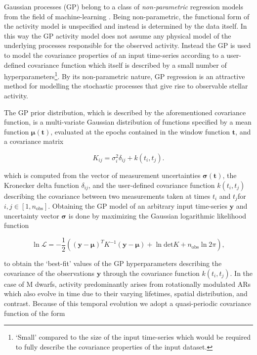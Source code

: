 Gaussian processes (GP) belong to a class of \emph{non-parametric} regression models from the field of machine-learning
\citep{rasmussen05}.
Being non-parametric, the functional form of the activity model is unspecified and instead is determined by the
data itself. In this way the GP activity model does not assume 
any physical model of the underlying processes responsible for the observed activity. Instead the GP is
used to model the covariance properties 
of an input time-series according to a user-defined covariance function which itself is described by a small number
of hyperparameters\footnote{`Small' compared to the size of the input time-series which would be required to fully
  describe the covariance properties of the input dataset.}.
By its non-parametric nature, GP regression is an attractive method for modelling the stochastic processes that give
rise to observable stellar activity.

The GP prior distribution, which is described by the aforementioned covariance function,
is a multi-variate Gaussian distribution of functions specified by a mean function
$\boldsymbol{\mu}(\mathbf{t})$, evaluated at the epochs contained in the window function $\mathbf{t}$,
and a covariance matrix

\begin{equation}
  K_{ij} = \sigma_i^2 \delta_{ij} + k(t_i,t_j). \label{BSeq:K}
\end{equation}

\noindent which
is computed from the vector of measurement uncertainties $\boldsymbol{\sigma}(\mathbf{t})$,
the Kronecker delta function $\delta_{ij}$, and
the user-defined covariance function $k(t_i,t_j)$ describing the covariance between two measurements taken at
times $t_i$ and $t_j$for $i,j \in [1,n_{\text{obs}}]$.
Obtaining the GP model of an arbitrary input time-series $\mathbf{y}$ and uncertainty vector
$\boldsymbol{\sigma}$ is done by maximizing the Gaussian logarithmic likelihood function

\begin{equation}
  \ln{\mathcal{L}} = -\frac{1}{2} \left( (\mathbf{y}-\boldsymbol{\mu})^T K^{-1}
  (\mathbf{y}-\boldsymbol{\mu}) + \ln{\mathrm{det} K} + n_{\text{obs}} \ln{2 \pi} \right), \label{BSeq:like}
\end{equation}
  
\noindent to obtain the `best-fit' values of the GP hyperparameters describing the covariance of the observations
$\mathbf{y}$ through the covariance function $k(t_i,t_j)$.
In the case of M dwarfs, activity predominantly arises from rotationally modulated ARs which also
evolve in time due to their varying lifetimes, spatial distribution, and contrast.
Because of this temporal evolution we adopt a quasi-periodic covariance function
of the form

